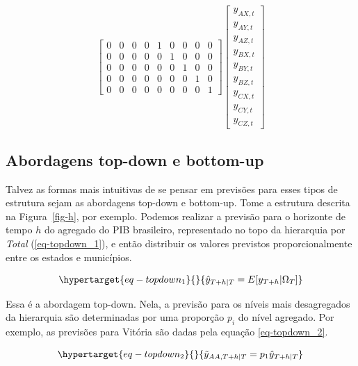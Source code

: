 \documentclass[
  12pt,
  oneside,
  a4paper,
  chapter=TITLE,
  section=TITLE,
  brazil]{abntex2}
\begin{document}
\begin{equation}
{\begin{bmatrix}
    0 & 0 & 0 & 0 & 1 & 0 & 0 & 0 & 0 \\
    0 & 0 & 0 & 0 & 0 & 1 & 0 & 0 & 0 \\
    0 & 0 & 0 & 0 & 0 & 0 & 1 & 0 & 0 \\
    0 & 0 & 0 & 0 & 0 & 0 & 0 & 1 & 0 \\
    0 & 0 & 0 & 0 & 0 & 0 & 0 & 0 & 1
\end{bmatrix}
\begin{bmatrix}
    y_{AX, t} \\
    y_{AY, t} \\
    y_{AZ, t} \\
    y_{BX, t} \\
    y_{BY, t} \\
    y_{BZ, t} \\
    y_{CX, t} \\
    y_{CY, t} \\
    y_{CZ, t}
\end{bmatrix}
}\label{eq-matriz_ha}\end{equation}

\hypertarget{abordagens-top-down-e-bottom-up}{%
\subsection{Abordagens top-down e
bottom-up}\label{abordagens-top-down-e-bottom-up}}

Talvez as formas mais intuitivas de se pensar em previsões para esses
tipos de estrutura sejam as abordagens top-down e bottom-up. Tome a
estrutura descrita na Figura~\ref{fig-h}, por exemplo. Podemos realizar
a previsão para o horizonte de tempo \(h\) do agregado do PIB
brasileiro, representado no topo da hierarquia por \emph{Total}
(\ref{eq-topdown_1}), e então distribuir os valores previstos
proporcionalmente entre os estados e municípios.

\begin{equation}\protect\hypertarget{eq-topdown_1}{}{
\hat{y}_{T+h | T} = E[y_{T+h} | \Omega_T]
}\label{eq-topdown_1}\end{equation}

Essa é a abordagem top-down. Nela, a previsão para os níveis mais
desagregados da hierarquia são determinadas por uma proporção \(p_i\) do
nível agregado. Por exemplo, as previsões para Vitória são dadas pela
equação \ref{eq-topdown_2}.

\begin{equation}\protect\hypertarget{eq-topdown_2}{}{
\tilde{y}_{AA, T+h | T} = p_{1}\hat{y}_{T+h | T}
}\label{eq-topdown_2}\end{equation}
\end{document}
